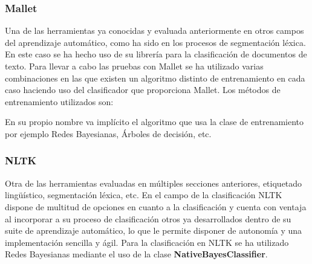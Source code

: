 \documentclass[runningheads,a4paper]{llncs}
\theoremstyle{break}
\begin{document}
\subsubsection{Mallet}
\textbf{}

Una de las herramientas ya conocidas y evaluada anteriormente en otros campos del aprendizaje automático, como ha sido en los procesos de segmentación léxica. En este caso se ha hecho uso de su librería para la clasificación de documentos de texto. Para llevar a cabo las pruebas con Mallet se ha utilizado varias combinaciones en las que existen un algoritmo distinto de entrenamiento en cada caso haciendo uso del clasificador que proporciona Mallet. Los métodos de entrenamiento utilizados son:

\begin{Parallel}{0.45\textwidth}{0.45\textwidth}
\ParallelPar
\end{Parallel}

En su propio nombre va implícito el algoritmo que usa la clase de entrenamiento por ejemplo Redes Bayesianas, Árboles de decisión, etc.

\subsubsection{NLTK}
\textbf{}

Otra de las herramientas evaluadas en múltiples secciones anteriores, etiquetado lingüístico, segmentación léxica, etc. En el campo de la clasificación NLTK dispone de multitud de opciones en cuanto a la clasificación y cuenta con ventaja al incorporar a su proceso de clasificación otros ya desarrollados dentro de su suite de aprendizaje automático, lo que le permite disponer de autonomía y una implementación sencilla y ágil. Para la clasificación en NLTK se ha utilizado Redes Bayesianas mediante el uso de la clase \textbf{NativeBayesClassifier}.
\end{document}
